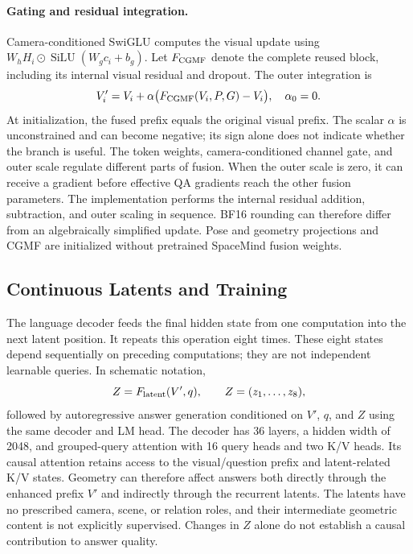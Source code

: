 \paragraph{Gating and residual integration.}
Camera-conditioned SwiGLU computes the visual update using $W_hH_i\odot\operatorname{SiLU}(W_gc_i+b_g)$. Let $F_{\rm CGMF}$ denote the complete reused block, including its internal visual residual and dropout. The outer integration is
\begin{equation}
V'_i=V_i+\alpha\big(F_{\rm CGMF}(V_i,P,G)-V_i\big),\quad\alpha_0=0.
\label{eq:residual}
\end{equation}
At initialization, the fused prefix equals the original visual prefix. The scalar $\alpha$ is unconstrained and can become negative; its sign alone does not indicate whether the branch is useful. The token weights, camera-conditioned channel gate, and outer scale regulate different parts of fusion. When the outer scale is zero, it can receive a gradient before effective QA gradients reach the other fusion parameters. The implementation performs the internal residual addition, subtraction, and outer scaling in sequence. BF16 rounding can therefore differ from an algebraically simplified update. Pose and geometry projections and CGMF are initialized without pretrained SpaceMind fusion weights.

\subsection{Continuous Latents and Training}
The language decoder feeds the final hidden state from one computation into the next latent position. It repeats this operation eight times. These eight states depend sequentially on preceding computations; they are not independent learnable queries. In schematic notation,
\begin{equation}
Z=F_{\rm latent}(V',q),\qquad Z=(z_1,\ldots,z_8),
\end{equation}
followed by autoregressive answer generation conditioned on $V'$, $q$, and $Z$ using the same decoder and LM head. The decoder has 36 layers, a hidden width of 2048, and grouped-query attention with 16 query heads and two K/V heads. Its causal attention retains access to the visual/question prefix and latent-related K/V states. Geometry can therefore affect answers both directly through the enhanced prefix $V'$ and indirectly through the recurrent latents. The latents have no prescribed camera, scene, or relation roles, and their intermediate geometric content is not explicitly supervised. Changes in $Z$ alone do not establish a causal contribution to answer quality.

